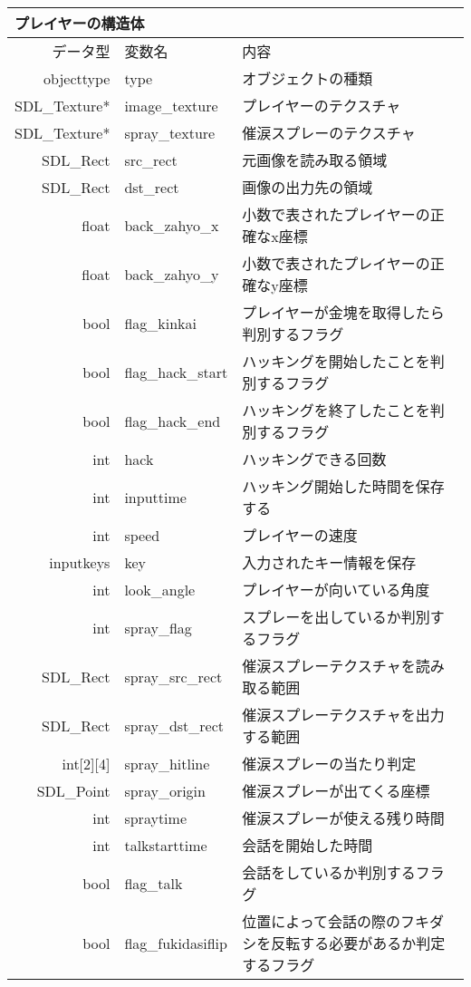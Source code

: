 \documentclass{jarticle}
\begin{document}
\begin{table}[H]
\begin{tabular}{|r|l|l|}
\hline
\multicolumn{3}{|l|}{プレイヤーの構造体}       \\ \hline
データ型      & 変数名    & 内容        \\ \hline
objecttype    & type & オブジェクトの種類  \\
SDL\_Texture* & image\_texture     & プレイヤーのテクスチャ \\
SDL\_Texture* & spray\_texture     & 催涙スプレーのテクスチャ \\
SDL\_Rect & src\_rect & 元画像を読み取る領域 \\
SDL\_Rect & dst\_rect & 画像の出力先の領域 \\
float & back\_zahyo\_x & 小数で表されたプレイヤーの正確なx座標\\
float & back\_zahyo\_y & 小数で表されたプレイヤーの正確なy座標\\
bool & flag\_kinkai & プレイヤーが金塊を取得したら判別するフラグ\\
bool & flag\_hack\_start & ハッキングを開始したことを判別するフラグ\\
bool & flag\_hack\_end & ハッキングを終了したことを判別するフラグ\\
int &hack & ハッキングできる回数\\
int & inputtime & ハッキング開始した時間を保存する\\
int & speed & プレイヤーの速度\\
inputkeys &key & 入力されたキー情報を保存\\
int & look\_angle & プレイヤーが向いている角度\\
int & spray\_flag & スプレーを出しているか判別するフラグ\\
SDL\_Rect & spray\_src\_rect & 催涙スプレーテクスチャを読み取る範囲\\
SDL\_Rect & spray\_dst\_rect & 催涙スプレーテクスチャを出力する範囲\\
int[2][4] & spray\_hitline & 催涙スプレーの当たり判定\\
SDL\_Point &spray\_origin &  催涙スプレーが出てくる座標 \\
int & spraytime & 催涙スプレーが使える残り時間\\
int & talkstarttime & 会話を開始した時間\\
bool & flag\_talk & 会話をしているか判別するフラグ \\
bool & flag\_fukidasiflip & 位置によって会話の際のフキダシを反転する必要があるか判定するフラグ\\ \hline
\end{tabular}
\end{table}
\end{document}
